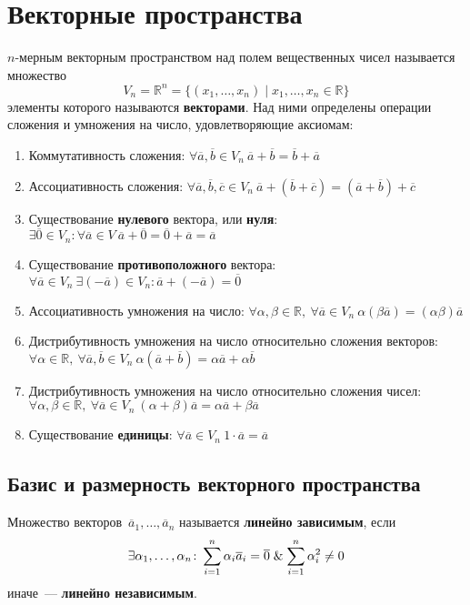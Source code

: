 \section{Векторные пространства}
 $n$\nobreakdash-мерным векторным пространством над полем вещественных чисел называется множество
\begin{equation*}
V_n = \mathbb R^n = \{ (x_1, \ldots, x_n) \mid x_1, \ldots, x_n \in \mathbb R \}
\end{equation*}
элементы которого называются \textbf{векторами}. Над ними определены операции сложения и умножения на число, удовлетворяющие аксиомам:
\begin{enumerate}
	\item Коммутативность сложения: $\forall \overline a, \overline b \in V_n \
	\overline a + \overline b = \overline b + \overline a$
	\item Ассоциативность сложения: $\forall \overline a, \overline b, \overline c \in V_n \
	\overline a + (\overline b + \overline c) = (\overline a + \overline b) + \overline c$
	\item Существование \textbf{нулевого} вектора, или \textbf{нуля}: $\exists \overline 0 \in V_n \colon \forall \overline a \in V \
	\overline a + \overline 0 = \overline 0 + \overline a = \overline a$
	\item Существование \textbf{противоположного} вектора: $\forall \overline a \in V_n \
	\exists (-\overline a) \in V_n \colon
	\overline a + (-\overline a) = \overline 0$
	\item Ассоциативность умножения на число: $\forall \alpha, \beta \in \mathbb R, \
	\forall \overline a \in V_n \
	\alpha (\beta \overline a) = (\alpha \beta) \overline a$
	\item Дистрибутивность умножения на число относительно сложения векторов: $\forall \alpha \in \mathbb R, \
	\forall \overline a, \overline b \in V_n \
	\alpha (\overline a + \overline b) = \alpha \overline a + \alpha \overline b$
	\item Дистрибутивность умножения на число относительно сложения чисел: $\forall \alpha, \beta \in \mathbb R, \
	\forall \overline a \in V_n \
	(\alpha + \beta) \overline a = \alpha \overline a + \beta \overline a$
	\item Существование \textbf{единицы}: $\forall \overline a \in V_n \
	1 \cdot \overline a = \overline a$
\end{enumerate}

\subsection{Базис и размерность векторного пространства}
Множество векторов~$\overline a_1, \ldots, \overline a_n$ называется \textbf{линейно зависимым}, если
\begin{equation*}
\exists \alpha_1, \ldots, \alpha_n \colon
\sum_{i=1}^n \alpha_i \overline a_i = \overline 0 \mathrel{\&}
\sum_{i=1}^n \alpha_i^2 \neq 0
\end{equation*}
иначе~--- \textbf{линейно независимым}.

